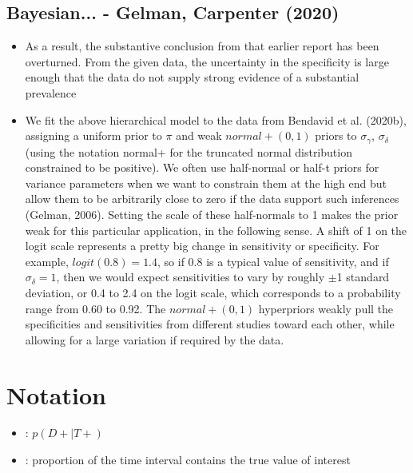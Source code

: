 \documentclass[11pt,notitlepage,twoside]{article}
\begin{document}
\subsection{Bayesian... - Gelman, Carpenter (2020)}
\begin{itemize}
\item As a result, the substantive conclusion from that earlier report has been overturned. From the given data, the uncertainty in the specificity is large enough that the data do not supply strong evidence of a substantial prevalence
\item We fit the above hierarchical model to the data from Bendavid et al. (2020b), assigning a uniform prior to $\pi$ and weak $normal+(0,1)$ priors to $\sigma_\gamma$, $\sigma_\delta$ (using the notation normal+ for the truncated normal distribution constrained to be positive). We often use half-normal or half-t priors for variance parameters when we want to constrain them at the high end but allow them to be arbitrarily close to zero if the data support such inferences (Gelman, 2006). Setting the scale of these half-normals to 1 makes the prior weak for this particular application, in the following sense. A shift of 1 on the logit scale represents a pretty big change in sensitivity or specificity. For example, $logit(0.8) = 1.4$, so if 0.8 is a typical value of sensitivity, and if $\sigma_\delta = 1$, then we would expect sensitivities to vary by roughly $\pm$1 standard deviation, or 0.4 to 2.4 on the logit scale, which corresponds to a probability range from 0.60 to 0.92. The $normal+(0,1)$ hyperpriors weakly pull the specificities and sensitivities from different studies toward each other, while allowing for a large variation if required by the data.

\end{itemize}


\section{Notation}
\begin{itemize}
\item {}: $p(D+ \mid T+)$
\item {}: proportion of the time interval contains the true value of interest
\end{itemize}
%


\end{document}
